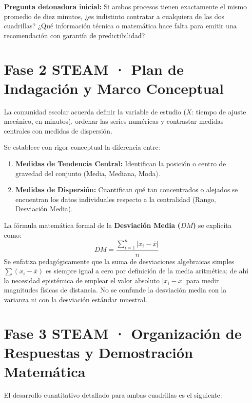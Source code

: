 \documentclass[spanish,letterpaper,oneside]{article}
\begin{document}
\textbf{Pregunta detonadora inicial:} Si ambos procesos tienen exactamente el mismo promedio de diez minutos, ¿es indistinto contratar a cualquiera de las dos cuadrillas? ¿Qué información técnica o matemática hace falta para emitir una recomendación con garantía de predictibilidad?

\section{Fase 2 STEAM · Plan de Indagación y Marco Conceptual}
La comunidad escolar acuerda definir la variable de estudio ($X$: tiempo de ajuste mecánico, en minutos), ordenar las series numéricas y contrastar medidas centrales con medidas de dispersión.

Se establece con rigor conceptual la diferencia entre:
\begin{enumerate}[label=\alph*)]
	\item \textbf{Medidas de Tendencia Central:} Identifican la posición o centro de gravedad del conjunto (Media, Mediana, Moda).
	\item \textbf{Medidas de Dispersión:} Cuantifican qué tan concentrados o alejados se encuentran los datos individuales respecto a la centralidad (Rango, Desviación Media).
\end{enumerate}

La fórmula matemática formal de la \textbf{Desviación Media ($DM$)} se explicita como:
\begin{equation}
	DM = \frac{\sum_{i=1}^{n} |x_i - \bar{x}|}{n}
\end{equation}
Se enfatiza pedagógicamente que la suma de desviaciones algebraicas simples $\sum (x_i - \bar{x})$ es siempre igual a cero por definición de la media aritmética; de ahí la necesidad epistémica de emplear el valor absoluto $|x_i - \bar{x}|$ para medir magnitudes físicas de distancia. No se confunde la desviación media con la varianza ni con la desviación estándar muestral.

\section{Fase 3 STEAM · Organización de Respuestas y Demostración Matemática}
El desarrollo cuantitativo detallado para ambas cuadrillas es el siguiente:
\end{document}

